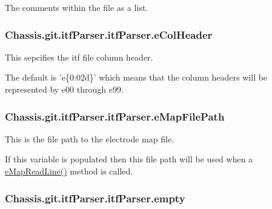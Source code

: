 The comments within the file as a list. 

\hypertarget{class_chassis_8git_1_1itf_parser_1_1itf_parser_a6b33c67f09f9e00b2123608603319604}{
\subsubsection[{e\-Col\-Header}]{\setlength{\rightskip}{0pt plus 5cm}Chassis.\-git.\-itf\-Parser.\-itf\-Parser.\-e\-Col\-Header}}\label{class_chassis_8git_1_1itf_parser_1_1itf_parser_a6b33c67f09f9e00b2123608603319604}


This sepcifies the itf file column header. 

The default is 'e\{0\-:02d\}' which means that the column headers will be represented by e00 through e99. \hypertarget{class_chassis_8git_1_1itf_parser_1_1itf_parser_a30e8967fe68b381f94cf97c8f9a26475}{
\subsubsection[{e\-Map\-File\-Path}]{\setlength{\rightskip}{0pt plus 5cm}Chassis.\-git.\-itf\-Parser.\-itf\-Parser.\-e\-Map\-File\-Path}}\label{class_chassis_8git_1_1itf_parser_1_1itf_parser_a30e8967fe68b381f94cf97c8f9a26475}


This is the file path to the electrode map file. 

If this variable is populated then this file path will be used when a \hyperlink{class_chassis_8git_1_1itf_parser_1_1itf_parser_a2e00fa383a8b60fe0b058cf2c9b57f1d}{e\-Map\-Read\-Line()} method is called. \hypertarget{class_chassis_8git_1_1itf_parser_1_1itf_parser_a75bd647d304a98ce719934c5696ac49b}{
\subsubsection[{empty}]{\setlength{\rightskip}{0pt plus 5cm}Chassis.\-git.\-itf\-Parser.\-itf\-Parser.\-empty}}\label{class_chassis_8git_1_1itf_parser_1_1itf_parser_a75bd647d304a98ce719934c5696ac49b}


